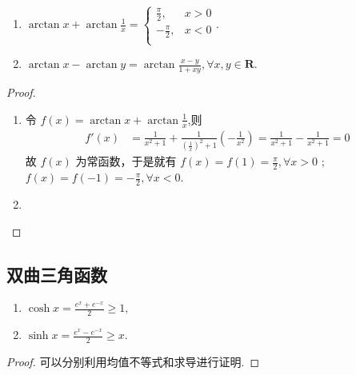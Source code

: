 \documentclass[../../main.tex]{subfiles}
\begin{document}
\begin{proposition}\label{proposition:arctan相关等式}
\begin{enumerate}[(1)]
\item $\arctan x+\arctan \frac{1}{x}=\begin{cases}
\frac{\pi}{2},&x>0\\
-\frac{\pi}{2},&x<0\\
\end{cases}$.

\item $\arctan x - \arctan y = \arctan \frac{x - y}{1 + xy},\forall x,y\in \mathbf{R}.$
\end{enumerate}
\end{proposition}
\begin{proof}
\begin{enumerate}
\item 令 \( f(x)=\arctan x+\arctan\frac{1}{x} \),则
\begin{align*}
f'(x)&=\frac{1}{x^2 + 1}+\frac{1}{(\frac{1}{x})^2 + 1}(-\frac{1}{x^2})=\frac{1}{x^2 + 1}-\frac{1}{x^2 + 1}=0
\end{align*}
故 \( f(x) \) 为常函数，于是就有 \( f(x)=f(1)=\frac{\pi}{2},\forall x>0 \) ;\( f(x)=f(-1)=-\frac{\pi}{2},\forall x<0 \).

\item 
\end{enumerate}
\end{proof}


\subsection{双曲三角函数}

\begin{proposition}
\begin{enumerate}[(1)]
\item $\cosh x=\frac{e^{x}+e^{-x}}{2}\geqslant1,$

\item $\sinh x=\frac{e^{x}-e^{-x}}{2}\geqslant x.$
\end{enumerate}
\end{proposition}
\begin{proof}
可以分别利用均值不等式和求导进行证明. 
\end{proof}
\end{document}
